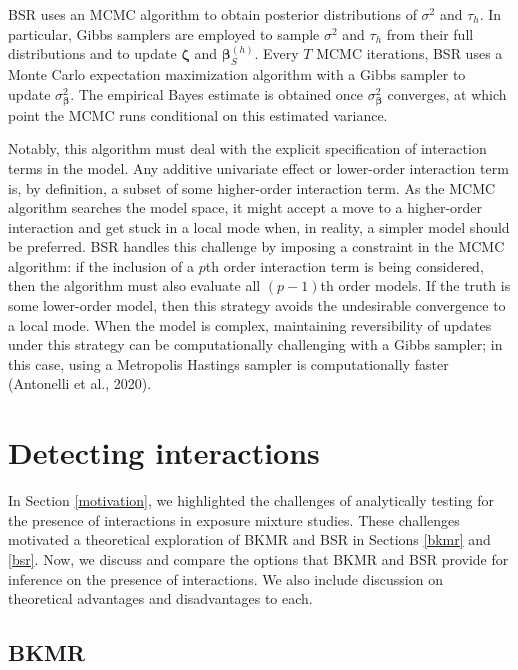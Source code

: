 \documentclass[12pt, twoside]{amherstthesis}
\begin{document}
BSR uses an MCMC algorithm to obtain posterior distributions of \(\sigma^2\) and \(\tau_h\). In particular, Gibbs samplers are employed to sample \(\sigma^2\) and \(\tau_h\) from their full distributions and to update \(\boldsymbol\zeta\) and \(\boldsymbol\beta_S^{(h)}\). Every \(T\) MCMC iterations, BSR uses a Monte Carlo expectation maximization algorithm with a Gibbs sampler to update \(\sigma^2_{\boldsymbol\beta}\). The empirical Bayes estimate is obtained once \(\sigma^2_{\boldsymbol\beta}\) converges, at which point the MCMC runs conditional on this estimated variance.

Notably, this algorithm must deal with the explicit specification of interaction terms in the model. Any additive univariate effect or lower-order interaction term is, by definition, a subset of some higher-order interaction term. As the MCMC algorithm searches the model space, it might accept a move to a higher-order interaction and get stuck in a local mode when, in reality, a simpler model should be preferred. BSR handles this challenge by imposing a constraint in the MCMC algorithm: if the inclusion of a \(p\)th order interaction term is being considered, then the algorithm must also evaluate all \((p-1)\)th order models. If the truth is some lower-order model, then this strategy avoids the undesirable convergence to a local mode. When the model is complex, maintaining reversibility of updates under this strategy can be computationally challenging with a Gibbs sampler; in this case, using a Metropolis Hastings sampler is computationally faster (Antonelli et al., 2020).

\hypertarget{detecting-interactions}{%
\section{Detecting interactions}\label{detecting-interactions}}

In Section \ref{motivation}, we highlighted the challenges of analytically testing for the presence of interactions in exposure mixture studies. These challenges motivated a theoretical exploration of BKMR and BSR in Sections \ref{bkmr} and \ref{bsr}. Now, we discuss and compare the options that BKMR and BSR provide for inference on the presence of interactions. We also include discussion on theoretical advantages and disadvantages to each.

\hypertarget{bkmr-1}{%
\subsection{BKMR}\label{bkmr-1}}
\end{document}
